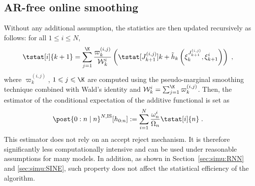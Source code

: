 \documentclass{article}
\newcommand{\af}[1]{h_{#1}}
\newcommand{\addf}[1]{\termletter_{#1}}
\newcommand{\termletter}{\tilde{h}}
\newcommand{\N}{N}
\newcommand{\hkup}{\bar{\varepsilon}}
\newcommand{\bi}[3]{J_{#1}^{(#2, #3)}}
\newcommand{\eqdef}{\ensuremath{:=}}
\newcommand{\eqsp}{\;}
\newcommand{\ewght}[2]{\ensuremath{\omega_{#1}^{#2}}}
\newcommand{\epart}[2]{\ensuremath{\xi_{#1}^{#2}}}
\newcommand{\sumwght}[2][]{%
\ifthenelse{\equal{#1}{}}{\ensuremath{\Omega_{#2}}}{\ensuremath{\Omega_{#2}^{(#1)}}}}
\newcommand{\kernelmarg}{\mathbf{R}}
\newcommand{\hatqg}[1]{\mathsf{\ell}_{#1}}
\begin{document}
\subsection{AR-free online smoothing}
Without any additional assumption, the statistics are then updated recursively as follows: for all $1\leqslant i\leqslant \N$,
\begin{equation}
\label{eq:update:paris:marginal:is}
\tstat[i]{k+1} =\sum_{j=1}^{\K}\frac{\varpi_k^{(i,j)}}{\mathcal{W}_k^i}\left( \tstat[\bi{k+1}{i}{j}]{k} + \addf{k}\left(\epart{k}{\bi{k+1}{i}{j}}, \epart{k+1}{i}\right)\right)\eqsp,
\end{equation}
where $\varpi_k^{(i,j)}$, $1\leqslant j \leqslant \K$ are computed using the pseudo-marginal smoothing technique combined with Wald's identity and $\mathcal{W}_k^i = \sum_{j=1}^{\K} \varpi_k^{(i,j)}$.
Then, the estimator of the conditional expectation of the additive functional is set as
\[
\post{0:n\mid n}^{\N,\textrm{IS}} [\af{0:n}] \eqdef \sum_{i=1}^{\N}\frac{\ewght{n}{i}}{\sumwght{n}}\tstat[i]{n}\eqsp.
\]
This estimator does not rely on an accept reject mechanism. %
It is therefore significantly less computationally intensive and can be used under reasonable assumptions for many models. 
In addition, as shown in Section~\ref{sec:simu:RNN} and \ref{sec:simu:SINE}, %
such property does not affect the statistical efficiency of the algorithm.
\end{document}
